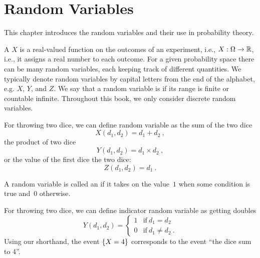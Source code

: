 \chapter{Random Variables}
\label{ch:probability::randvar}

\begin{preamble}
This chapter introduces the random variables and their use in probability theory.
\end{preamble}


\begin{flex}
\begin{definition}
\label{def:probability::rv}
A  $X$ is a real-valued function on the outcomes
of an experiment, i.e., $X : \Omega \to \mathbb{R}$, i.e., it assigns a real
number to each outcome.
%
For a given probability space there can be many random variables, each keeping
track of different quantities.
%
We typically denote random variables by capital letters from
the end of the alphabet, e.g. $X$, $Y$, and $Z$.
%
We say that a random variable is  if its range is
finite or countable infinite.  Throughout this book, we only consider
discrete random variables. 
\end{definition}

\begin{example}
For throwing two dice, we can define random variable as the sum of
the two dice
\[
X(d_1,d_2) = d_1+d_2~,
\]
the product of two dice
\[
Y(d_1,d_2) = d_1 \times d_2~,
\]
or the value of the first dice
the two dice:
\[
Z(d_1,d_2) = d_1~.
\]
\end{example}
\end{flex}

\begin{flex}
\begin{definition}
A random variable is called an  if it
takes on the value~$1$ when some condition is true and~$0$
otherwise.
\end{definition}
\begin{example}
  For throwing two dice, we can define indicator random variable
  as getting doubles
\[
Y(d_1,d_2) =
\left\{
\begin{array}{ll}
1 & \mbox{if}~d_1 = d_2
\\
0 & \mbox{if}~d_1 \not= d_2 ~.
\end{array}
\right.
\]
Using our shorthand, the event $\{X =4\}$ corresponds
to the event ``the dice sum to 4''.
\end{example}
\end{flex}

